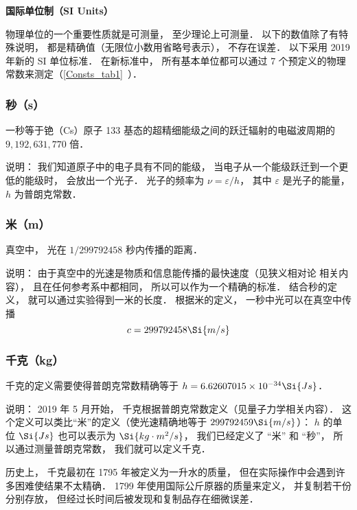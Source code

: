


\textbf{国际单位制（SI Units）}

物理单位的一个重要性质就是可测量， 至少理论上可测量． 以下的数值除了有特殊说明， 都是精确值（无限位小数用省略号表示）， 不存在误差． 以下采用 2019 年新的 SI 单位标准． 在新标准中， 所有基本单位都可以通过 7 个预定义的物理常数来测定（\autoref{Consts_tab1}~）．

\subsubsection{秒（s）}
一秒等于铯（Cs）原子 133 基态的超精细能级之间的跃迁辐射的电磁波周期的 $9,192,631,770$ 倍． 

说明： 我们知道原子中的电子具有不同的能级， 当电子从一个能级跃迁到一个更低的能级时， 会放出一个光子． 光子的频率为 $\nu  = \varepsilon /h$，   其中 $\varepsilon $ 是光子的能量， $h$ 为普朗克常数．

\subsubsection{米（m）}
真空中， 光在 $1/299792458$ 秒内传播的距离．

说明： 由于真空中的光速是物质和信息能传播的最快速度（见狭义相对论 相关内容）， 且在任何参考系中都相同， 所以可以作为一个精确的标准． 结合秒的定义， 就可以通过实验得到一米的长度． 根据米的定义， 一秒中光可以在真空中传播
\begin{equation}
c = 299792458 \Si{m/s}
\end{equation}

\subsubsection{千克（kg）}
千克的定义需要使得普朗克常数精确等于 $h = 6.62607015\times10^{-34}\Si{Js}$．

说明： 2019 年 5 月开始， 千克根据普朗克常数定义（见量子力学相关内容）． 这个定义可以类比“米”的定义（使光速精确地等于 $299792459\Si{m/s}$）： $h$ 的单位 $\Si{Js}$ 也可以表示为 $\Si{kg\cdot m^2/s}$， 我们已经定义了 “米” 和 “秒”， 所以通过测量普朗克常数， 我们就可以定义千克．

历史上， 千克最初在 1795 年被定义为一升水的质量， 但在实际操作中会遇到许多困难使结果不太精确． 1799 年使用国际公斤原器的质量来定义， 并复制若干份分别存放， 但经过长时间后被发现和复制品存在细微误差．

